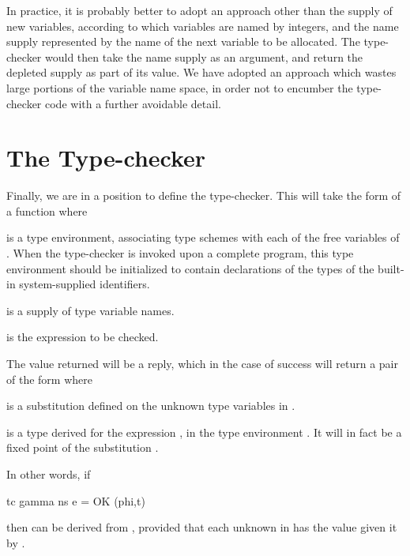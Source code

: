 In practice, it is probably better to adopt an approach other than the supply
of new variables, according to which variables are named by integers, and the
name supply represented by the name of the next variable to be allocated. The
type-checker would then take the name supply as an argument, and return the
depleted supply as part of its value. We have adopted an approach which
wastes large portions of the variable name space, in order not to encumber the
type-checker code with a further avoidable detail.

\section{The Type-checker}

Finally, we are in a position to define the type-checker. This will take the form
of a function  where
\begin{numbered}
    \item {} is a type environment, associating type schemes with each of the
    free variables of . When the type-checker is invoked upon a complete
    program, this type environment should be initialized to contain
    declarations of the types of the built-in system-supplied identifiers.
    \item {} is a supply of type variable names.
    \item {} is the expression to be checked.
\end{numbered}
The value returned will be a reply, which in the case of success will return a
pair of the form  where
\begin{numbered}
    \item {} is a substitution defined on the unknown type variables in .
    \item {} is a type derived for the expression , in the type environment
    . It will in fact be a fixed point of the substitution .
\end{numbered}
In other words, if
\begin{mlcoded}
    tc gamma ns e = OK (phi,t)
\end{mlcoded}
then  can be derived from , provided that each unknown  in
 has the value given it by .


